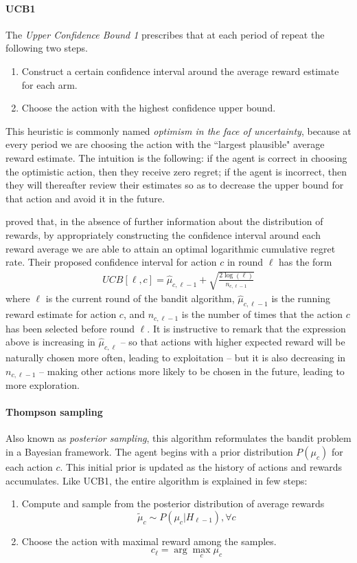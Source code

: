 \paragraph{UCB1} The \emph{Upper Confidence Bound 1} prescribes that at each period of repeat the following two steps.
\begin{enumerate}
    \item Construct a certain confidence interval around the average reward estimate for each arm. 
    \item Choose the action with the highest confidence upper bound.
\end{enumerate}

This heuristic is commonly named \emph{optimism in the face of uncertainty}\citet{kaelbling1996reinforcement}, because at every period we are choosing the action with the ``largest plausible"\cite[Ch. 3]{lattimore2018bandits} average reward estimate. The intuition is the following: if the agent is correct in choosing the optimistic action, then they receive zero regret; if the agent is incorrect, then they will thereafter review their estimates so as to decrease the upper bound for that action and avoid it in the future. 

\cite{auer2002finite} proved that, in the absence of further information about the distribution of rewards, by appropriately constructing the confidence interval around each reward average we are able to attain an optimal logarithmic cumulative regret rate. Their proposed confidence interval for action $c$ in round $\ell$ has the form
\begin{align}
UCB[\ell, c] = \hat{\mu}_{c,\ell-1} + \sqrt{\frac{2\log(\ell)}{n_{c,\ell-1}} }   
\end{align}
\noindent where $\ell$ is the current round of the bandit algorithm, $\hat{\mu}_{c,\ell-1}$ is the running reward estimate for action $c$, and $n_{c,\ell-1}$ is the number of times that the action $c$ has been selected before round $\ell$. It is instructive to remark that the expression above is increasing in $\hat{\mu}_{c,\ell}$ -- so that actions with higher expected reward will be naturally chosen more often, leading to exploitation -- but it is also decreasing in $n_{c,\ell-1}$ -- making other actions more likely to be chosen in the future, leading to more exploration. 

\paragraph{Thompson sampling} Also known as \emph{posterior sampling}, this algorithm reformulates the bandit problem in a Bayesian framework. The agent begins with a prior distribution $P(\mu_c)$ for each action $c$. This initial prior is updated as the history of actions and rewards accumulates. Like UCB1, the entire algorithm is explained in few steps:
\begin{enumerate}
  \item Compute and sample from the posterior distribution of average rewards 
  $$\tilde{\mu}_c \sim P(\mu_c | H_{\ell-1}), \forall c$$
  \item Choose the action with maximal reward among the samples.
  $$c_{\ell} = \arg\max_c \mu_c$$
\end{enumerate}

